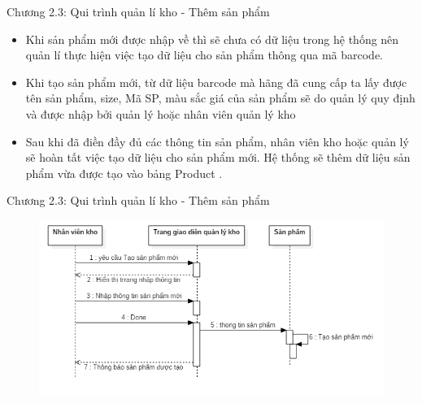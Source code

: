 \documentclass{beamer}
\begin{document}
\begin{frame}{Chương 2.3: Qui trình quản lí kho - Thêm sản phẩm}
    \begin{itemize}
        \item Khi sản phẩm mới được nhập về thì sẽ chưa có dữ liệu trong hệ thống nên quản lí thực hiện việc tạo dữ liệu cho sản phẩm thông qua mã barcode.\\
        \item Khi tạo sản phẩm mới, từ dữ liệu barcode mà hãng đã cung cấp ta lấy được tên sản phẩm, size, Mã SP, màu sắc giá của sản phẩm sẽ do quản lý quy định và được nhập bởi quản lý hoặc nhân viên quản lý kho\\ 
        \item Sau khi đã điền đầy đủ các thông tin sản phẩm, nhân viên kho hoặc quản lý sẽ hoàn tất việc tạo dữ liệu cho sản phẩm mới. Hệ thống sẽ thêm dữ liệu sản phẩm vừa được tạo vào bảng Product .
    \end{itemize}
\end{frame}
\begin{frame}{Chương 2.3: Qui trình quản lí kho - Thêm sản phẩm}
    \begin{figure}
        \centering
        \includegraphics[scale =0.5]{12.png}

    \end{figure}
\end{frame}
\end{document}
